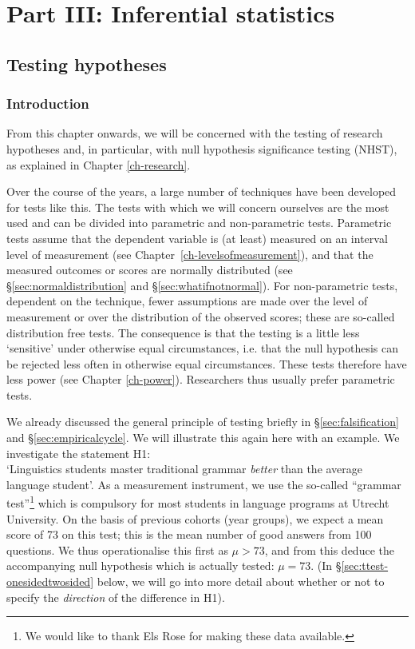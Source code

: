 \documentclass[
]{book}
\begin{document}
\hypertarget{part-part-iii-inferential-statistics}{%
\part*{Part III: Inferential statistics}\label{part-part-iii-inferential-statistics}}

\hypertarget{ch-testing}{%
\chapter{Testing hypotheses}\label{ch-testing}}

\hypertarget{sec:testing-introduction}{%
\section{Introduction}\label{sec:testing-introduction}}

From this chapter onwards, we will be concerned with the testing of
research hypotheses and, in particular, with null hypothesis significance testing (NHST),
as explained in Chapter \ref{ch-research}.

Over the course of the years, a large number of techniques have been developed
for tests like this. The tests with which we will concern ourselves
are the most used and can be divided into parametric
and non-parametric tests. Parametric tests assume that the dependent
variable is (at least) measured on an interval level of measurement (see
Chapter~\ref{ch-levelsofmeasurement}), and that the measured outcomes or
scores are normally distributed (see
§\ref{sec:normaldistribution} and §\ref{sec:whatifnotnormal}).
For non-parametric tests, dependent on the technique,
fewer assumptions are made over the level of measurement or over
the distribution of the observed scores; these are so-called
distribution free tests. The consequence is that the testing
is a little less `sensitive' under otherwise equal circumstances, i.e.
that the null hypothesis can be rejected less often in
otherwise equal circumstances. These tests therefore have less power (see
Chapter \ref{ch-power}). Researchers thus usually prefer parametric
tests.

We already discussed the general principle of testing briefly in
§\ref{sec:falsification} and §\ref{sec:empiricalcycle}.
We will illustrate this again here
with an example. We investigate the statement H1:\\
`Linguistics students master traditional grammar \emph{better} than the average language student'. As a measurement instrument, we use the so-called ``grammar test''\footnote{We would like to thank Els Rose for making these data available.} which is compulsory
for most students
in language programs at Utrecht University. On the basis of previous cohorts (year groups),
we expect a mean score of 73 on this test; this is the mean number of good answers
from 100 questions. We thus operationalise this first as \(\mu > 73\), and from this deduce
the accompanying null hypothesis which is actually tested:
\(\mu = 73\).
(In §\ref{sec:ttest-onesidedtwosided} below, we will go into more detail
about whether or not to specify the \emph{direction} of the difference in H1).
\end{document}
